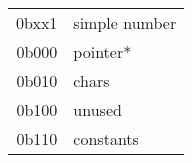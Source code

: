 


  \begin{tabular}{rl}
    \textsf{0bxx1} & simple number    \\
    \textsf{0b000} & pointer* \\
    \textsf{0b010} & chars \\
    \textsf{0b100} & unused \\
    \textsf{0b110} & constants \\
  \end{tabular}

